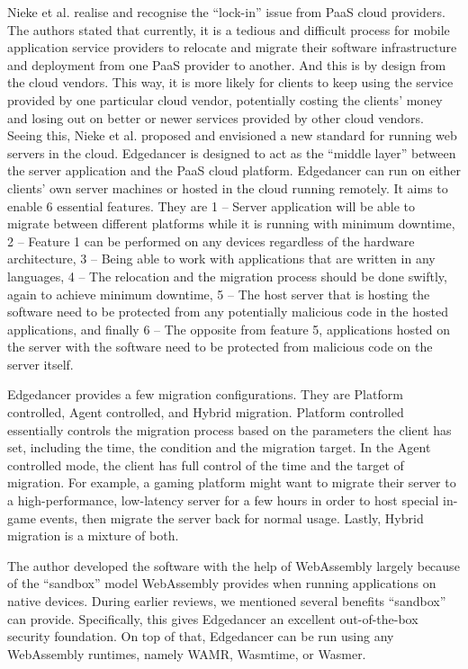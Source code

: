 Nieke et al. realise and recognise the “lock-in” issue from PaaS cloud providers. The authors stated that currently, it is a tedious and difficult process for mobile application service providers to relocate and migrate their software infrastructure and deployment from one PaaS provider to another. And this is by design from the cloud vendors. This way, it is more likely for clients to keep using the service provided by one particular cloud vendor, potentially costing the clients’ money and losing out on better or newer services provided by other cloud vendors. Seeing this, Nieke et al. proposed and envisioned a new standard for running web servers in the cloud. Edgedancer is designed to act as the “middle layer” between the server application and the PaaS cloud platform. Edgedancer can run on either clients’ own server machines or hosted in the cloud running remotely. It aims to enable 6 essential features. They are 1 – Server application will be able to migrate between different platforms while it is running with minimum downtime, 2 – Feature 1 can be performed on any devices regardless of the hardware architecture, 3 – Being able to work with applications that are written in any languages, 4 – The relocation and the migration process should be done swiftly, again to achieve minimum downtime, 5 – The host server that is hosting the software need to be protected from any potentially malicious code in the hosted applications, and finally 6 – The opposite from feature 5, applications hosted on the server with the software need to be protected from malicious code on the server itself.

Edgedancer provides a few migration configurations. They are Platform controlled, Agent controlled, and Hybrid migration. Platform controlled essentially controls the migration process based on the parameters the client has set, including the time, the condition and the migration target. In the Agent controlled mode, the client has full control of the time and the target of migration. For example, a gaming platform might want to migrate their server to a high-performance, low-latency server for a few hours in order to host special in-game events, then migrate the server back for normal usage. Lastly, Hybrid migration is a mixture of both.

The author developed the software with the help of WebAssembly largely because of the “sandbox” model WebAssembly provides when running applications on native devices. During earlier reviews, we mentioned several benefits “sandbox” can provide. Specifically, this gives Edgedancer an excellent out-of-the-box security foundation. On top of that, Edgedancer can be run using any WebAssembly runtimes, namely WAMR, Wasmtime, or Wasmer.

